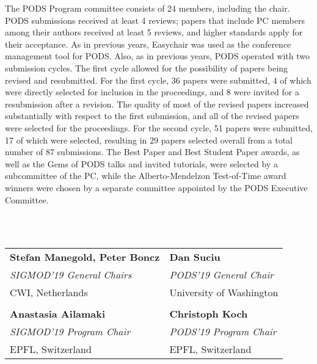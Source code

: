 The PODS Program committee consists of 24 members, including the chair. PODS submissions received at least 4 reviews; papers that include PC members among their authors received at least 5 reviews, and higher standards apply for their acceptance.  As in previous years, Easychair was used as the conference management tool for PODS. Also, as in previous years, PODS operated with two submission cycles. The first cycle allowed for the possibility of papers being revised and resubmitted. For the first cycle, 36 papers were submitted, 4 of which were directly selected for inclusion in the proceedings, and 8 were invited for a resubmission after a revision. The quality of most of the revised papers increased substantially with respect to the first submission, and all of the revised papers were selected for the proceedings. For the second cycle, 51 papers were submitted, 17 of which were selected, resulting in 29 papers selected overall from a total number of 87 submissions. The Best Paper and Best Student Paper awards, as well as the Gems of PODS talks and invited tutorials, were selected by a subcommittee of the PC, while the Alberto-Mendelzon Test-of-Time award winners were chosen by a separate committee appointed by the PODS Executive Committee.

~\\~

{\small%
\setlength{\tabcolsep}{0pt}
\begin{tabular*}{\textwidth}{@{\extracolsep{\fill}}ll}
\textbf{Stefan Manegold, Peter Boncz} & \textbf{Dan Suciu}           \\
\emph{SIGMOD'19 General Chairs}       & \emph{PODS'19 General Chair} \\
CWI, Netherlands                      & University of Washington     \\
\\
\textbf{Anastasia Ailamaki}           & \textbf{Christoph Koch}      \\
\emph{SIGMOD'19 Program Chair}        & \emph{PODS'19 Program Chair} \\
EPFL, Switzerland                     & EPFL, Switzerland            \\
\end{tabular*}
}
